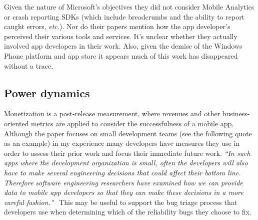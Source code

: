 Given the nature of Microsoft's objectives they did not consider Mobile Analytics or crash reporting SDKs (which include breadcrumbs and the ability to report caught errors, \emph{etc.}). Nor do their papers mention how the app developer's perceived their various tools and services. It's unclear whether they actually involved app developers in their work. Also, given the demise of the Windows Phone platform and app store it appears much of this work has disappeared without a trace.


\subsection{Power dynamics}



Monetization is a post-release measurement, where revenues and other business-oriented metrics are applied to consider the successfulness of a mobile app. Although the paper focuses on small development teams (see the following quote as an example) in my experience many developers have measures they use in order to assess their prior work and focus their immediate future work. 
\emph{``In such apps where the development organization is small, often the developers will also have to make several engineering decisions that could affect their bottom line. Therefore software engineering researchers have examined how we can provide data to mobile app developers so that they can make these decisions in a more careful fashion."}~\citep[p. 28]{nagappan2016_future_trends_in_sw_eng_for_mobile_apps} This may be useful to support the bug triage process that developers use when determining which of the reliability bugs they choose to fix.

